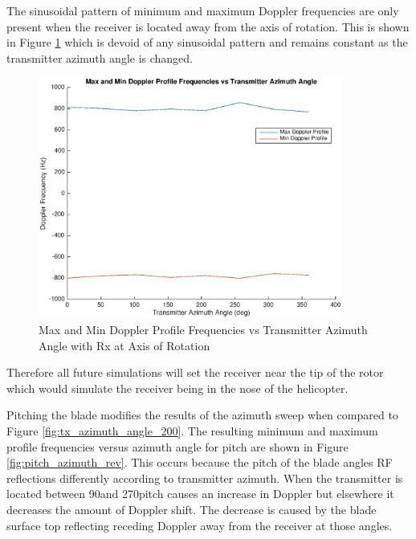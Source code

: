 The sinusoidal pattern of minimum and maximum Doppler frequencies are only present when the receiver is located away from the axis of rotation. This is shown in Figure \ref{fig:tx_azimuth_rx0} which is devoid of any sinusoidal pattern and remains constant as the transmitter azimuth angle is changed. 

\begin{figure}
	\begin{center}
		\includegraphics[width=10cm]{images/simulation/Azimuth_angle_rx0_max_doppler.eps}
		\caption{Max and Min Doppler Profile Frequencies vs Transmitter Azimuth Angle with Rx at Axis of Rotation}
		\label{fig:tx_azimuth_rx0}
	\end{center}
\end{figure}

Therefore all future simulations will set the receiver near the tip of the rotor which would simulate the receiver being in the nose of the helicopter.

Pitching the blade modifies the results of the azimuth sweep when compared to Figure \ref{fig:tx_azimuth_angle_200}. The resulting minimum and maximum profile frequencies versus azimuth angle for pitch are shown in Figure \ref{fig:pitch_azimuth_rev}. This occurs because the pitch of the blade angles RF reflections differently according to transmitter azimuth. When the transmitter is located between 90\textdegree \space and 270\textdegree \space pitch causes an increase in Doppler but elsewhere it decreases the amount of Doppler shift. The decrease is caused by the blade surface top reflecting receding Doppler away from the receiver at those angles.

